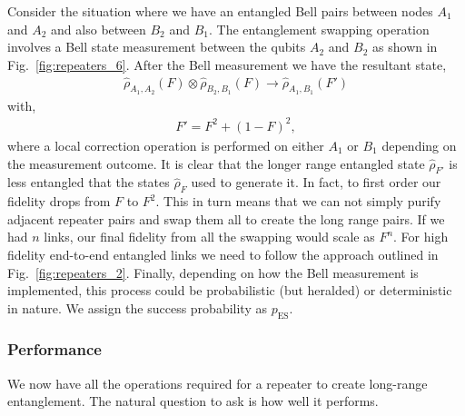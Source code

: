 \documentclass[twocolumn, aps, rmp, amsmath, amssymb, nofootinbib, superscriptaddress, longbibliography, floatfix, table-of-contents, eqsecnum]{revtex4-1}
\begin{document}
Consider the situation where we have an entangled Bell pairs between nodes $A_1$ and $A_2$ and also between $B_2$ and $B_1$. The entanglement swapping operation involves a Bell state measurement between the qubits $A_2$ and $B_2$ as shown in Fig.~\ref{fig:repeaters_6}. After the Bell measurement we have the resultant state, 
\begin{align}
\hat\rho_{A_1,A_2} (F)\otimes \hat\rho_{B_2,B_1}(F)\rightarrow \hat\rho_{A_1,B_1} (F')
\end{align}
with,
\begin{align}
	F'=F^2+(1-F)^2,
\end{align}
where a local correction operation is performed on either $A_1$ or $B_1$ depending on the measurement outcome. It is clear that the longer range entangled state $\hat\rho_{F'}$ is less entangled that the states $\hat\rho_F$ used to generate it. In fact, to first order our fidelity drops from $F$ to $F^2$. This in turn means that we can not simply purify adjacent repeater pairs and swap them all to create the long range pairs. If we had $n$ links, our final fidelity from all the swapping would scale as $F^n$. For high fidelity end-to-end entangled links we need to follow the approach outlined in Fig.~\ref{fig:repeaters_2}. Finally, depending on how the Bell measurement is implemented, this process could be probabilistic (but heralded) or deterministic in nature. We assign the success probability as $p_\mathrm{ES}$.

\subsubsection{Performance}

We now have all the operations required for a repeater to create long-range entanglement. The natural question to ask is how well it performs.
\end{document}
